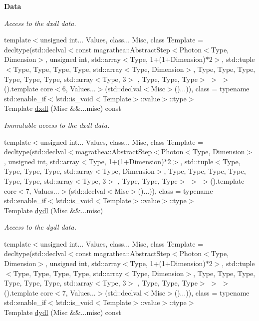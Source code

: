 \begin{Indent}{\bf Data}
\begin{DoxyCompactItemize}
\begin{DoxyCompactList}\small\item\em Access to the dxdl data. \end{DoxyCompactList}\item 
{\footnotesize template$<$unsigned int... Values, class... Misc, class Template  = decltype(std\-::declval$<$const magrathea\-::\-Abstract\-Step$<$\-Photon$<$\-Type, Dimension$>$, unsigned int, std\-::array$<$\-Type, 1+(1+\-Dimension)$\ast$2$>$, std\-::tuple$<$\-Type, Type, Type, Type, std\-::array$<$\-Type, Dimension$>$, Type, Type, Type, Type, Type, Type, std\-::array$<$\-Type, 3$>$ , Type, Type, Type$>$ $>$ $>$().\-template core$<$6, Values...$>$(std\-::declval$<$\-Misc$>$()...)), class  = typename std\-::enable\-\_\-if$<$!std\-::is\-\_\-void$<$\-Template$>$\-::value$>$\-::type$>$ }\\Template \hyperlink{exceptionPhoton_a5ad063b203917fcc24c358abaa958843}{dxdl} (Misc \&\&...misc) const 
\begin{DoxyCompactList}\small\item\em Immutable access to the dxdl data. \end{DoxyCompactList}\item 
{\footnotesize template$<$unsigned int... Values, class... Misc, class Template  = decltype(std\-::declval$<$magrathea\-::\-Abstract\-Step$<$\-Photon$<$\-Type, Dimension$>$, unsigned int, std\-::array$<$\-Type, 1+(1+\-Dimension)$\ast$2$>$, std\-::tuple$<$\-Type, Type, Type, Type, std\-::array$<$\-Type, Dimension$>$, Type, Type, Type, Type, Type, Type, std\-::array$<$\-Type, 3$>$ , Type, Type, Type$>$ $>$ $>$().\-template core$<$7, Values...$>$(std\-::declval$<$\-Misc$>$()...)), class  = typename std\-::enable\-\_\-if$<$!std\-::is\-\_\-void$<$\-Template$>$\-::value$>$\-::type$>$ }\\Template \hyperlink{exceptionPhoton_aea9b90661986fa88996f43edc90bfe5f}{dydl} (Misc \&\&...misc)
\begin{DoxyCompactList}\small\item\em Access to the dydl data. \end{DoxyCompactList}\item 
{\footnotesize template$<$unsigned int... Values, class... Misc, class Template  = decltype(std\-::declval$<$const magrathea\-::\-Abstract\-Step$<$\-Photon$<$\-Type, Dimension$>$, unsigned int, std\-::array$<$\-Type, 1+(1+\-Dimension)$\ast$2$>$, std\-::tuple$<$\-Type, Type, Type, Type, std\-::array$<$\-Type, Dimension$>$, Type, Type, Type, Type, Type, Type, std\-::array$<$\-Type, 3$>$ , Type, Type, Type$>$ $>$ $>$().\-template core$<$7, Values...$>$(std\-::declval$<$\-Misc$>$()...)), class  = typename std\-::enable\-\_\-if$<$!std\-::is\-\_\-void$<$\-Template$>$\-::value$>$\-::type$>$ }\\Template \hyperlink{exceptionPhoton_a8f0581f1a7925293c8ee7daaeceb0f01}{dydl} (Misc \&\&...misc) const 

\end{DoxyCompactItemize}
\end{Indent}

